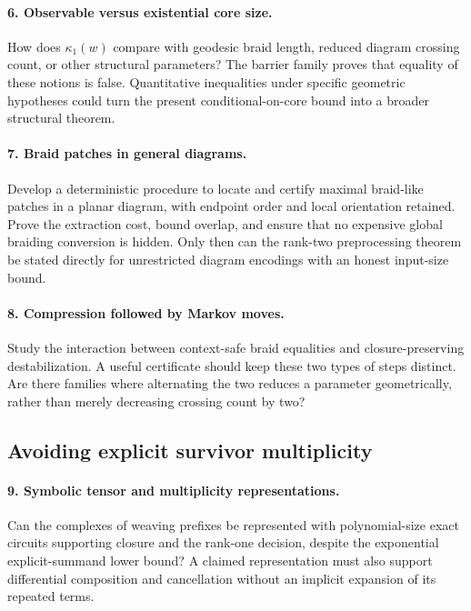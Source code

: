 \documentclass[11pt]{article}
\theoremstyle{definition}
\theoremstyle{remark}
\begin{document}
\paragraph{6. Observable versus existential core size.}
How does $\kappa_1(w)$ compare with geodesic braid length, reduced diagram
crossing count, or other structural parameters? The barrier family proves
that equality of these notions is false. Quantitative inequalities under
specific geometric hypotheses could turn the present conditional-on-core
bound into a broader structural theorem.

\paragraph{7. Braid patches in general diagrams.}
Develop a deterministic procedure to locate and certify maximal braid-like
patches in a planar diagram, with endpoint order and local orientation
retained. Prove the extraction cost, bound overlap, and ensure that no
expensive global braiding conversion is hidden. Only then can the
rank-two preprocessing theorem be stated directly for unrestricted diagram
encodings with an honest input-size bound.

\paragraph{8. Compression followed by Markov moves.}
Study the interaction between context-safe braid equalities and
closure-preserving destabilization. A useful certificate should keep these
two types of steps distinct. Are there families where alternating the two
reduces a parameter geometrically, rather than merely decreasing crossing
count by two?

\subsection{Avoiding explicit survivor multiplicity}
\paragraph{9. Symbolic tensor and multiplicity representations.}
Can the complexes of weaving prefixes be represented with polynomial-size
exact circuits supporting closure and the rank-one decision, despite the
exponential explicit-summand lower bound? A claimed representation must
also support differential composition and cancellation without an implicit
expansion of its repeated terms.
\end{document}
